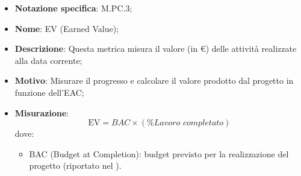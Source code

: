 \begin{itemize}
    \item \textbf{Notazione specifica}: M.PC.3;
    \item \textbf{Nome}: EV (Earned Value);
    \item \textbf{Descrizione}: Questa metrica misura il valore (in €) delle attività realizzate alla data corrente;
    \item \textbf{Motivo}: Misurare il progresso e calcolare il valore prodotto dal progetto in funzione dell'EAC;
    \item \textbf{Misurazione}:
    \[
        \text{EV} = \textit{BAC} \times (\% {\textit{Lavoro completato}})
    \]
    dove:
    \begin{itemize}
        \item BAC (Budget at Completion): budget previsto per la realizzazione del progetto (riportato nel \PianoDiProgetto).
    \end{itemize}
\end{itemize}
